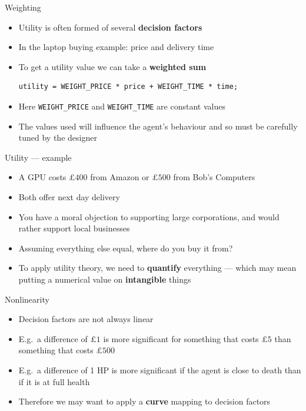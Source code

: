 \begin{frame}[fragile]{Weighting}
    \begin{itemize}
        \pause\item Utility is often formed of several \textbf{decision factors}
        \pause\item In the laptop buying example: price and delivery time
        \pause\item To get a utility value we can take a \textbf{weighted sum}
        \begin{lstlisting}
utility = WEIGHT_PRICE * price + WEIGHT_TIME * time;
        \end{lstlisting}
        \pause\item Here \lstinline{WEIGHT_PRICE} and \lstinline{WEIGHT_TIME} are constant values
        \pause\item The values used will influence the agent's behaviour and so must be carefully tuned by the designer
    \end{itemize}
\end{frame}

\begin{frame}{Utility --- example}
    \begin{itemize}
        \pause\item A GPU costs $\pounds 400$ from Amazon or $\pounds 500$ from Bob's Computers
        \pause\item Both offer next day delivery
        \pause\item You have a moral objection to supporting large corporations, and would rather support local businesses
        \pause\item Assuming everything else equal, where do you buy it from?
        \pause\item To apply utility theory, we need to \textbf{quantify} everything --- which may mean putting a numerical value on \textbf{intangible} things
    \end{itemize}
\end{frame}

\begin{frame}{Nonlinearity}
    \begin{itemize}
        \pause\item Decision factors are not always linear
        \pause\item E.g.\ a difference of $\pounds 1$ is more significant for something that costs $\pounds 5$
            than something that costs $\pounds 500$
        \pause\item E.g.\ a difference of 1 HP is more significant if the agent is close to death
            than if it is at full health
        \pause\item Therefore we may want to apply a \textbf{curve} mapping to decision factors 
    \end{itemize}
\end{frame}

